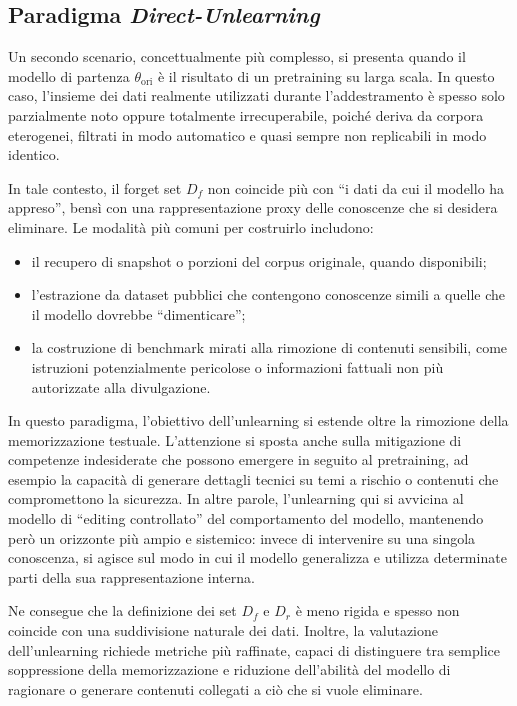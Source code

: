 \subsection{Paradigma \emph{Direct-Unlearning}}

Un secondo scenario, concettualmente più complesso, si presenta quando il modello di partenza $\theta_{\mathrm{ori}}$ è il risultato di un pretraining su larga scala. In questo caso, l’insieme dei dati realmente utilizzati durante l’addestramento è spesso solo parzialmente noto oppure totalmente irrecuperabile, poiché deriva da corpora eterogenei, filtrati in modo automatico e quasi sempre non replicabili in modo identico.

In tale contesto, il forget set $D_f$ non coincide più con “i dati da cui il modello ha appreso”, bensì con una rappresentazione proxy delle conoscenze che si desidera eliminare. Le modalità più comuni per costruirlo includono:
\begin{itemize}
\item il recupero di snapshot o porzioni del corpus originale, quando disponibili;
\item l’estrazione da dataset pubblici che contengono conoscenze simili a quelle che il modello dovrebbe “dimenticare”;
\item la costruzione di benchmark mirati alla rimozione di contenuti sensibili, come istruzioni potenzialmente pericolose o informazioni fattuali non più autorizzate alla divulgazione.
\end{itemize}

In questo paradigma, l’obiettivo dell’unlearning si estende oltre la rimozione della memorizzazione testuale. L’attenzione si sposta anche sulla mitigazione di competenze indesiderate che possono emergere in seguito al pretraining, ad esempio la capacità di generare dettagli tecnici su temi a rischio o contenuti che compromettono la sicurezza. In altre parole, l’unlearning qui si avvicina al modello di “editing controllato” del comportamento del modello, mantenendo però un orizzonte più ampio e sistemico: invece di intervenire su una singola conoscenza, si agisce sul modo in cui il modello generalizza e utilizza determinate parti della sua rappresentazione interna.

Ne consegue che la definizione dei set $D_f$ e $D_r$ è meno rigida e spesso non coincide con una suddivisione naturale dei dati. Inoltre, la valutazione dell'unlearning richiede metriche più raffinate, capaci di distinguere tra semplice soppressione della memorizzazione e riduzione dell’abilità del modello di ragionare o generare contenuti collegati a ciò che si vuole eliminare.

